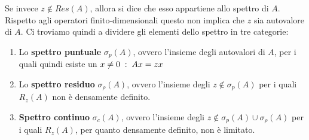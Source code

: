 Se invece $z \notin Res(A)$, allora si dice che esso appartiene allo spettro di $A$.
Rispetto agli operatori finito-dimensionali questo non implica che $z$ sia autovalore di $A$. Ci troviamo quindi a dividere gli elementi dello spettro in tre categorie:
\begin{enumerate}
	\item Lo \textbf{spettro puntuale} $\sigma_p(A)$, ovvero l'insieme degli autovalori di $A$, per i quali quindi esiste un $x \neq 0 \; : \; Ax = zx$
	
	\item Lo \textbf{spettro residuo} $\sigma_\rho(A)$, ovvero l'insieme degli $z\notin \sigma_p(A)$ per i quali $R_z(A)$ non è densamente definito.
	
	\item \textbf{Spettro continuo} $\sigma_c(A)$, ovvero l'insieme degli $z\notin \sigma_p(A) \cup \sigma_\rho (A)$  per i quali $R_z(A)$, per quanto densamente definito, non è limitato.
\end{enumerate}

\newpage

